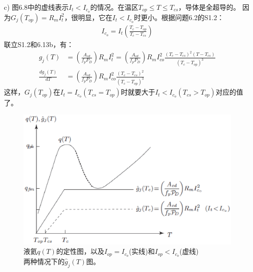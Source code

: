 c) 图6.8中的虚线表示$I_t<I_{c_o}$的情况。在温区$T_{op}\le T\le T_{cs}$，导体是全超导的。
因为$G_j(T_{op})=R_m I_t^2$，很明显，它在$I_t<I_{c_o}$时更小。根据问题6.2的S1.2：
\begin{align*}%
I_{c_o}=I_t(\frac{T_c-T_{op} }{T_c-T_{cs}}) \tag{S1.2}
\end{align*}
联立S1.2和6.13b，有：
\begin{align*}%
g_j(T)&=(\frac{A_{cd}}{f_pP_D})R_mI_t^2=(\frac{A_{cd}}{f_pP_D})R_mI_{co}^2\frac{(T_c-T_{cs})^2(T-T_{cs})}{(T_c-T_{op})^3}\\
\frac{dg_j(T)}{dT}&=(\frac{A_{cd}}{f_pP_D})R_mI_{co}^2\frac{(T_c-T_{cs})^2}{(T_c-T_{op})^3}
\end{align*}
这样，$G_j(T_{op})$在$I_t=I_{c_o}(T_{cs}=T_{op})$时就要大于$I_t<I_{c_o}(T_{cs}>T_{op})$对应的值了。
\begin{figure}[htbp]
	\centering
	\includegraphics[scale=0.6]{chpt6/figs/fig6.8.eps}
	\caption{液氦$q(T)$的定性图，以及$I_{op}=I_{c_o}$(实线)和$I_{op}<I_{c_o}$(虚线)$两种情况下的$$\hat{g}_j(T)$图。}
\end{figure}


